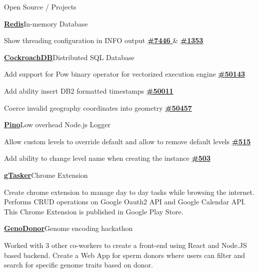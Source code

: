 \documentclass{resume}
\begin{document}
  \vspace{-0.5em}

  \begin{rSection}{Open Source / Projects}
    \begin{rProjectSection}{\href{https://github.com/redis/redis}{\textbf{Redis}}}{In-memory Database}
      \item Show threading configuration in INFO output \href{https://github.com/redis/redis/pull/7446}{ \textbf{\#7446} } \& \href{https://github.com/redis/redis-doc/pull/1353}{\textbf{\#1353}}
    \end{rProjectSection}
    \vspace{-1em}
    \begin{rProjectSection}{\href{https://github.com/cockroachdb/cockroach}{\textbf {CockroachDB}}}{Distributed SQL Database}
      \item Add support for Pow binary operator for vectorized execution engine \href{https://github.com/cockroachdb/cockroach/pull/50143}{\textbf{\#50143}}
      \item Add ability insert DB2 formatted timestamps \href{https://github.com/cockroachdb/cockroach/pull/50011}{\textbf{\#50011}}
      \item Coerce invalid geography coordinates into geometry \href{https://github.com/cockroachdb/cockroach/pull/50457}{\textbf{\#50457}}
    \end{rProjectSection}
    \vspace{-1em}
    \begin{rProjectSection}{\href{https://github.com/pinojs/pino}{\textbf{Pino}}}{Low overhead Node.js Logger}
      \item Allow custom levels to override default and allow to remove default levels \href{https://github.com/pinojs/pino/pull/515}{ \textbf{\#515} }
      \item Add ability to change level name when creating the instance \href{https://github.com/pinojs/pino/pull/515}{ \textbf{\#503} }
    \end{rProjectSection}
    \vspace{-1em}
    \begin{rProjectSection}{\href{https://chrome.google.com/webstore/detail/gtasker-extension/lljekoepijafpdebkahcjdhbjaappami?hl=en-GB}{\textbf{gTasker}}}{Chrome Extension}
      \item Create chrome extension to manage day to day tasks while browsing the internet. Performs CRUD operations on Google Oauth2 API and Google Calendar API. This Chrome Extension is published in Google Play Store.
    \end{rProjectSection}
    \vspace{-1em}
    \begin{rProjectSection}{\href{https://github.com/Arun4rangan/GenoDonor}{\textbf{GenoDonor}}}{Genome encoding hackathon}
      \item Worked with 3 other co-workers to create a front-end using React and Node.JS based backend. Create a Web App for sperm donors where users can filter and search for specific genome traits based on donor.
    \end{rProjectSection}
  \end{rSection}
  
\end{document}
